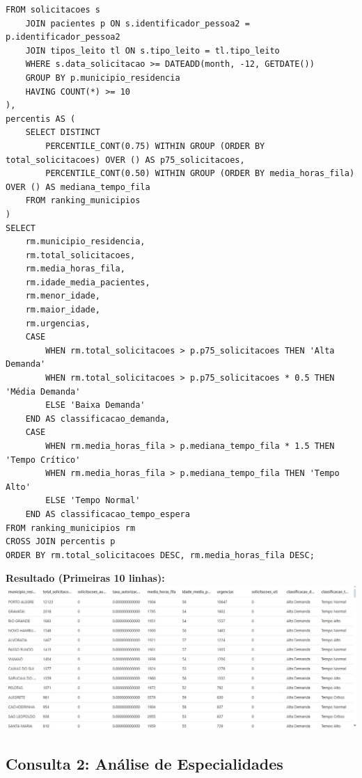 \documentclass[12pt,a4paper]{article}
\begin{document}
\begin{lstlisting}[style=sqlstyle, caption=Ranking de Municípios por Solicitações]
    FROM solicitacoes s
    JOIN pacientes p ON s.identificador_pessoa2 = p.identificador_pessoa2
    JOIN tipos_leito tl ON s.tipo_leito = tl.tipo_leito
    WHERE s.data_solicitacao >= DATEADD(month, -12, GETDATE())
    GROUP BY p.municipio_residencia
    HAVING COUNT(*) >= 10
),
percentis AS (
    SELECT DISTINCT
        PERCENTILE_CONT(0.75) WITHIN GROUP (ORDER BY total_solicitacoes) OVER () AS p75_solicitacoes,
        PERCENTILE_CONT(0.50) WITHIN GROUP (ORDER BY media_horas_fila) OVER () AS mediana_tempo_fila
    FROM ranking_municipios
)
SELECT 
    rm.municipio_residencia,
    rm.total_solicitacoes,
    rm.media_horas_fila,
    rm.idade_media_pacientes,
    rm.menor_idade,
    rm.maior_idade,
    rm.urgencias,
    CASE 
        WHEN rm.total_solicitacoes > p.p75_solicitacoes THEN 'Alta Demanda'
        WHEN rm.total_solicitacoes > p.p75_solicitacoes * 0.5 THEN 'Média Demanda'
        ELSE 'Baixa Demanda'
    END AS classificacao_demanda,
    CASE 
        WHEN rm.media_horas_fila > p.mediana_tempo_fila * 1.5 THEN 'Tempo Crítico'
        WHEN rm.media_horas_fila > p.mediana_tempo_fila THEN 'Tempo Alto'
        ELSE 'Tempo Normal'
    END AS classificacao_tempo_espera
FROM ranking_municipios rm
CROSS JOIN percentis p
ORDER BY rm.total_solicitacoes DESC, rm.media_horas_fila DESC;
\end{lstlisting}

\textbf{Resultado (Primeiras 10 linhas):\\}
\includegraphics[width=1.0\textwidth]{comnsulta1_result.jpg}

\subsection{Consulta 2: Análise de Especialidades}
\end{document}

